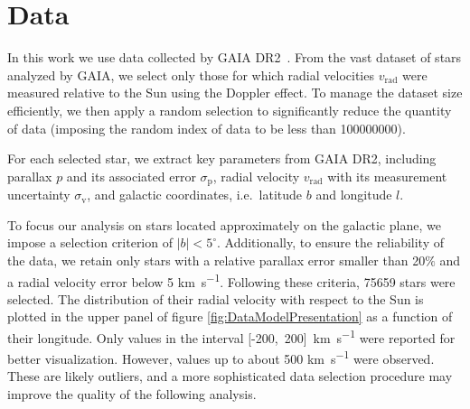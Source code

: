 \section{Data}

In this work we use data collected by GAIA DR2~\cite{GAIADR2}. 
From the vast dataset of stars analyzed by GAIA, we select only those 
for which radial velocities $v_{\text{rad}}$ were measured relative to the Sun using the Doppler effect. 
To manage the dataset size efficiently, we then apply a random selection to significantly reduce the quantity of data 
(imposing the random index of data to be less than 100000000).

For each selected star, we extract key parameters from GAIA DR2, 
including parallax $p$ and its associated error $\sigma_{\text{p}}$, 
radial velocity $v_{\text{rad}}$ with its measurement uncertainty $\sigma_{\text{v}}$, 
and galactic coordinates, i.e.\ latitude $b$ and longitude $l$.

To focus our analysis on stars located approximately on the galactic plane, we impose a selection criterion of $\vert b \vert < 5^{\circ}$. 
Additionally, to ensure the reliability of the data, we retain only stars with a relative parallax error smaller than 20$\%$ 
and a radial velocity error below 5 \unit{\kilo\meter\per\second}. 
Following these criteria, 75659 stars were selected. The distribution of their radial velocity 
with respect to the Sun is plotted in the upper panel of figure \ref{fig:DataModelPresentation} 
as a function of their longitude. Only values in the interval 
[-200,~200]~\unit{\kilo\meter\per\second} were reported for better visualization. 
However, values up to about 500 \unit{\kilo\meter\per\second} were observed. 
These are likely outliers, and a more sophisticated data selection procedure may improve the quality of the following analysis.

